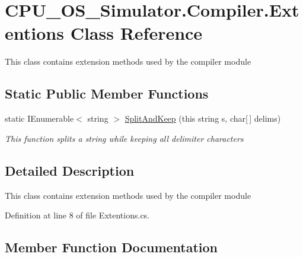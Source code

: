\hypertarget{class_c_p_u___o_s___simulator_1_1_compiler_1_1_extentions}{}\section{C\+P\+U\+\_\+\+O\+S\+\_\+\+Simulator.\+Compiler.\+Extentions Class Reference}
\label{class_c_p_u___o_s___simulator_1_1_compiler_1_1_extentions}


This class contains extension methods used by the compiler module  


\subsection*{Static Public Member Functions}
\begin{DoxyCompactItemize}
\item 
static I\+Enumerable$<$ string $>$ \hyperlink{class_c_p_u___o_s___simulator_1_1_compiler_1_1_extentions_aef24f4a7dbc51d56f6dbca8886b397a1}{Split\+And\+Keep} (this string s, char\mbox{[}$\,$\mbox{]} delims)
\begin{DoxyCompactList}\small\item\em This function splits a string while keeping all delimiter characters \end{DoxyCompactList}\end{DoxyCompactItemize}


\subsection{Detailed Description}
This class contains extension methods used by the compiler module 



Definition at line 8 of file Extentions.\+cs.



\subsection{Member Function Documentation}
\hypertarget{class_c_p_u___o_s___simulator_1_1_compiler_1_1_extentions_aef24f4a7dbc51d56f6dbca8886b397a1}{}
